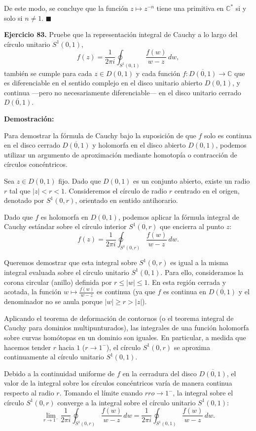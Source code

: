 \documentclass[11pt,a4paper]{article}
\theoremstyle{definition}
\theoremstyle{plain}
\theoremstyle{remark}
\begin{document}
	De este modo, se concluye que la función $z \mapsto z^{-n}$ tiene una primitiva en $\mathbb{C}^*$ si y solo si $n \neq 1$. $\blacksquare$
	
	\noindent \textbf{Ejercicio 83.} Pruebe que la representación integral de Cauchy a lo largo del círculo unitario $S^1(0, 1)$,
	\[
	f(z) = \frac{1}{2\pi i} \oint_{S^1(0, 1)} \frac{f(w)}{w - z} \, dw,
	\]
	también se cumple para cada $z \in D(0, 1)$ y cada función $f : \overline{D(0, 1)} \to \mathbb{C}$ que es diferenciable en el sentido complejo en el disco unitario abierto $D(0, 1)$, y continua —pero no necesariamente diferenciable— en el disco unitario cerrado $\overline{D(0, 1)}$.
	
	\vspace{1em}
	\noindent \textbf{Demostración:}
	
	Para demostrar la fórmula de Cauchy bajo la suposición de que $f$ solo es continua en el disco cerrado $\overline{D(0, 1)}$ y holomorfa en el disco abierto $D(0, 1)$, podemos utilizar un argumento de aproximación mediante homotopía o contracción de círculos concéntricos.
	
	Sea $z \in D(0, 1)$ fijo. Dado que $D(0, 1)$ es un conjunto abierto, existe un radio $r$ tal que $|z| < r < 1$. 
	Consideremos el círculo de radio $r$ centrado en el origen, denotado por $S^1(0, r)$, orientado en sentido antihorario. 
	
	Dado que $f$ es holomorfa en $D(0, 1)$, podemos aplicar la fórmula integral de Cauchy estándar sobre el círculo interior $S^1(0, r)$ que encierra al punto $z$:
	\[
	f(z) = \frac{1}{2\pi i} \oint_{S^1(0, r)} \frac{f(w)}{w - z} \, dw.
	\]
	
	Queremos demostrar que esta integral sobre $S^1(0, r)$ es igual a la misma integral evaluada sobre el círculo unitario $S^1(0, 1)$. 
	Para ello, consideramos la corona circular (anillo) definida por $r \leq |w| \leq 1$. En esta región cerrada y acotada, la función $w \mapsto \frac{f(w)}{w - z}$ es continua (ya que $f$ es continua en $\overline{D(0, 1)}$ y el denominador no se anula porque $|w| \ge r > |z|$).
	
	Aplicando el teorema de deformación de contornos (o el teorema integral de Cauchy para dominios multipunturados), las integrales de una función holomorfa sobre curvas homótopas en un dominio son iguales. En particular, a medida que hacemos tender $r$ hacia $1$ ($r \to 1^-$), el círculo $S^1(0, r)$ se aproxima continuamente al círculo unitario $S^1(0, 1)$.
	
	Debido a la continuidad uniforme de $f$ en la cerradura del disco $\overline{D(0, 1)}$, el valor de la integral sobre los círculos concéntricos varía de manera continua respecto al radio $r$. Tomando el límite cuando $rro \to 1^-$, la integral sobre el círculo $S^1(0, r)$ converge a la integral sobre el círculo unitario $S^1(0, 1)$:
	\[
	\lim_{r \to 1^-} \frac{1}{2\pi i} \oint_{S^1(0, r)} \frac{f(w)}{w - z} \, dw = \frac{1}{2\pi i} \oint_{S^1(0, 1)} \frac{f(w)}{w - z} \, dw.
	\]
	
\end{document}
